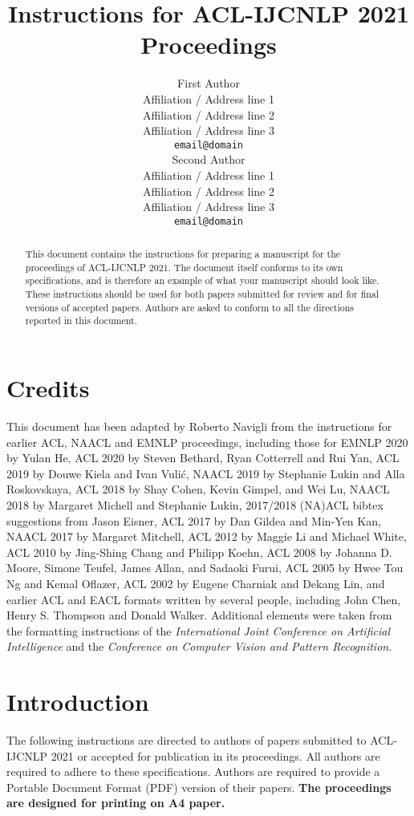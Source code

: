 \documentclass[11pt,a4paper]{article}
\title{Instructions for ACL-IJCNLP 2021 Proceedings}
\author{First Author \\
  Affiliation / Address line 1 \\
  Affiliation / Address line 2 \\
  Affiliation / Address line 3 \\
  \texttt{email@domain} \\\And
  Second Author \\
  Affiliation / Address line 1 \\
  Affiliation / Address line 2 \\
  Affiliation / Address line 3 \\
  \texttt{email@domain} \\}
\date{}
\begin{document}
\maketitle
\begin{abstract}
This document contains the instructions for preparing a manuscript for the proceedings of ACL-IJCNLP 2021.
The document itself conforms to its own specifications, and is therefore an example of what your manuscript should look like.
These instructions should be used for both papers submitted for review and for final versions of accepted papers.
Authors are asked to conform to all the directions reported in this document.
\end{abstract}

\section{Credits}

This document has been adapted by Roberto Navigli
from the instructions for earlier ACL, NAACL and EMNLP proceedings, including those for 
EMNLP 2020 by Yulan He,
ACL 2020 by Steven Bethard, Ryan Cotterrell and Rui Yan, 
ACL 2019 by Douwe Kiela and Ivan Vuli\'{c},
NAACL 2019 by Stephanie Lukin and Alla Roskovskaya, 
ACL 2018 by Shay Cohen, Kevin Gimpel, and Wei Lu, 
NAACL 2018 by Margaret Michell and Stephanie Lukin,
2017/2018 (NA)ACL bibtex suggestions from Jason Eisner,
ACL 2017 by Dan Gildea and Min-Yen Kan, 
NAACL 2017 by Margaret Mitchell, 
ACL 2012 by Maggie Li and Michael White, 
ACL 2010 by Jing-Shing Chang and Philipp Koehn, 
ACL 2008 by Johanna D. Moore, Simone Teufel, James Allan, and Sadaoki Furui, 
ACL 2005 by Hwee Tou Ng and Kemal Oflazer, 
ACL 2002 by Eugene Charniak and Dekang Lin, 
and earlier ACL and EACL formats written by several people, including
John Chen, Henry S. Thompson and Donald Walker.
Additional elements were taken from the formatting instructions of the \emph{International Joint Conference on Artificial Intelligence} and the \emph{Conference on Computer Vision and Pattern Recognition}.

\section{Introduction}

The following instructions are directed to authors of papers submitted to ACL-IJCNLP 2021 or accepted for publication in its proceedings.
All authors are required to adhere to these specifications.
Authors are required to provide a Portable Document Format (PDF) version of their papers.
\textbf{The proceedings are designed for printing on A4 paper.}
\end{document}
